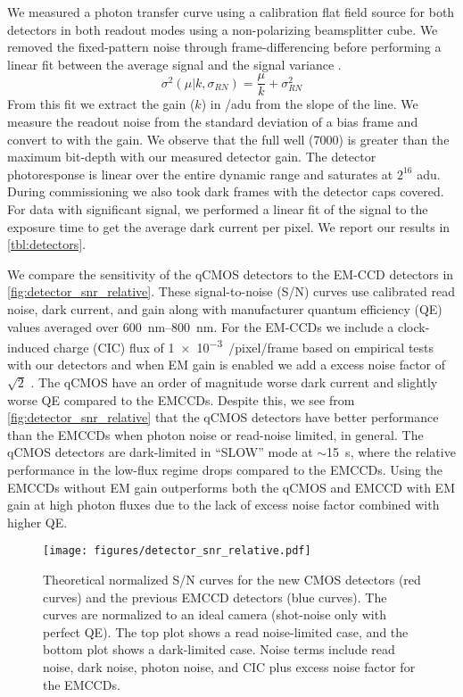 We measured a photon transfer curve using a calibration flat field source for both detectors in both readout modes using a non-polarizing beamsplitter cube. We removed the fixed-pattern noise through frame-differencing before performing a linear fit between the average signal and the signal variance \citep{stefanov_cmos_2022}. 
\begin{equation}
    \sigma^2\left(\mu | k, \sigma_{RN}\right) = \frac{\mu}{k} + \sigma^2_{RN}
\end{equation}
From this fit we extract the gain ($k$) in \si{\electron/adu} from the slope of the line. We measure the readout noise from the standard deviation of a bias frame and convert to \si{\electron} with the gain. We observe that the full well (\SI{7000}{\electron}) is greater than the maximum bit-depth with our measured detector gain. The detector photoresponse is linear over the entire dynamic range and saturates at $2^{16}$ \si{adu}. During commissioning we also took dark frames with the detector caps covered. For data with significant signal, we performed a linear fit of the signal to the exposure time to get the average dark current per pixel. We report our results in \autoref{tbl:detectors}.

We compare the sensitivity of the qCMOS detectors to the EM-CCD detectors in \autoref{fig:detector_snr_relative}. These signal-to-noise (S/N) curves use calibrated read noise, dark current, and gain along with manufacturer quantum efficiency (QE) values averaged over \SIrange{600}{800}{nm}. For the EM-CCDs we include a clock-induced charge (CIC) flux of \SI{1e-3}{\electron/pixel/frame} based on empirical tests with our detectors and when EM gain is enabled we add a excess noise factor of $\sqrt{2}$ \citep{janesick_photon_2007}. The qCMOS have an order of magnitude worse dark current and slightly worse QE compared to the EMCCDs. Despite this, we see from \autoref{fig:detector_snr_relative} that the qCMOS detectors have better performance than the EMCCDs when photon noise or read-noise limited, in general. The qCMOS detectors are dark-limited in ``SLOW'' mode at $\sim$\SI{15}{s}, where the relative performance in the low-flux regime drops compared to the EMCCDs. Using the EMCCDs without EM gain outperforms both the qCMOS and EMCCD with EM gain at high photon fluxes due to the lack of excess noise factor combined with higher QE.

\begin{figure}
    \centering
    \texttt{[image: figures/detector\_snr\_relative.pdf]}
    \caption{Theoretical normalized S/N curves for the new CMOS detectors (red curves) and the previous EMCCD detectors (blue curves). The curves are normalized to an ideal camera (shot-noise only with perfect QE). The top plot shows a read noise-limited case, and the bottom plot shows a dark-limited case. Noise terms include read noise, dark noise, photon noise, and CIC plus excess noise factor for the EMCCDs.\label{fig:detector_snr_relative}}
\end{figure}

